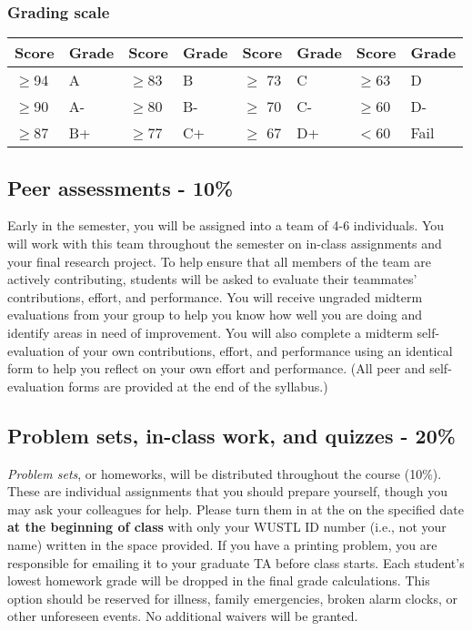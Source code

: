 \documentclass[11pt]{article}
\begin{document}
\subsubsection*{Grading scale}
\vspace{2mm}

\begin{center}
\begin{tabular}{| l l | l l | l l | l l |}
\hline
Score & Grade & Score & Grade & Score & Grade& Score & Grade \\
\hline
$\ge$94 & A  & $\ge$83 & B & $\ge$ 73 &  C &$\ge$63 & D   \\
$\ge$90 & A-  & $\ge$80 & B- & $\ge$ 70 &  C- &$\ge$60 & D- \\
$\ge$87 & B+ & $\ge$77 & C+ & $\ge$ 67 &  D+& $<$60 & Fail \\
\hline

\end{tabular}
\end{center}



\subsection*{Peer assessments - 10\%}

Early in the semester, you will be assigned into a team of 4-6
individuals.  You will work with this team throughout the semester on
in-class assignments and your final research project.  To help ensure
that all members of the team are actively contributing, students will
be asked to evaluate their teammates' contributions, effort, and
performance.  You will receive ungraded midterm evaluations from your
group to help you know how well you are doing and identify areas in
need of improvement. You will also complete a midterm self-evaluation
of your own contributions, effort, and performance using an identical
form to help you reflect on your own effort and performance. (All peer
and self-evaluation forms are provided at the end of the syllabus.)



\subsection*{Problem sets, in-class work, and quizzes - 20\%}

\noindent \textit{Problem sets}, or homeworks, will be distributed
throughout the course (10\%). These are individual assignments that you
should prepare yourself, though you may ask your colleagues for
help. Please turn them in at the on the specified date \textbf{at the
  beginning of class} with only your WUSTL ID number (i.e., not your
name) written in the space provided. If you have a printing problem,
you are responsible for emailing it to your graduate TA before class
starts.  Each student's lowest homework grade will be dropped in
the final grade calculations.  This option should be reserved for
illness, family emergencies, broken alarm clocks, or other unforeseen
events.  No additional waivers will be granted.
\end{document}
